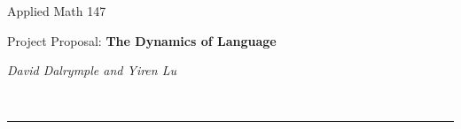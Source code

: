 \documentclass[letter,11pt]{article}
\begin{document}
\begin{center}
\parbox[b]{3cm}{\hfill Applied Math 147 \hfill} \hspace{1cm} Project Proposal: \textbf{The Dynamics of Language} \hspace{1cm} \parbox[b]{5cm}{\hfill \textit{David Dalrymple and Yiren Lu} \hfill} \\[-3mm]
\rule{\textwidth}{0.4pt}
\end{center}
\end{document}
